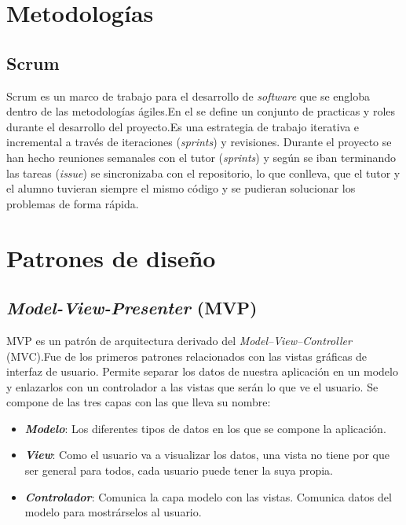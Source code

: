 
\section{Metodologías}\label{metodologias}

\subsection{Scrum}\label{scrum}

Scrum es un marco de trabajo para el desarrollo de \emph{software} que se
engloba dentro de las metodologías ágiles.En el se define un conjunto de practicas y roles durante el desarrollo del proyecto.Es una estrategia de trabajo iterativa e incremental a través de iteraciones (\emph{sprints})
y revisiones. 
Durante el proyecto se han hecho reuniones semanales con el tutor (\emph{sprints}) y según se iban terminando las tareas (\emph{issue}) se sincronizaba con el repositorio, lo que conlleva, que el tutor y el alumno tuvieran siempre el mismo código y se pudieran solucionar los problemas de forma rápida. %

\section{Patrones de diseño}\label{patrones-de-diseno}

\subsection{\emph{Model-View-Presenter} (MVP)}\label{model-view-presenter-mvp}

MVP es un patrón de arquitectura derivado del
\emph{Model--View--Controller} (MVC).Fue de los primeros patrones relacionados con las vistas gráficas de interfaz de usuario. Permite separar los datos de nuestra aplicación en un modelo y enlazarlos con un controlador a las vistas que serán lo que ve el usuario.%
Se compone de las tres capas con las que lleva su nombre:

\begin{itemize}
	\tightlist
	\item
	\textit{\textbf{Modelo}}: Los diferentes tipos de datos en los que se compone la aplicación.
	\item
	\textit{\textbf{View}}: Como el usuario va a visualizar los datos, una vista no tiene por que ser general para todos, cada usuario puede tener la suya propia.
	\item
	\textit{\textbf{Controlador}}: Comunica la capa modelo con las vistas. Comunica datos del modelo para mostrárselos al usuario.
\end{itemize}

